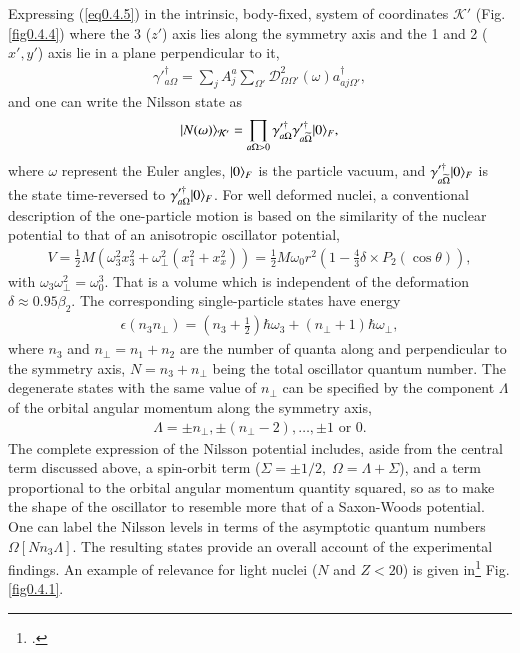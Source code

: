 Expressing (\ref{eq0.4.5}) in the intrinsic, body-fixed, system of coordinates $\mathcal K'$ (Fig. \ref{fig0.4.4}) where the 3 ($z'$) axis lies along the symmetry axis and the 1 and 2 ($x',y'$) axis lie in a plane perpendicular to it, 
\begin{align}\label{eq0.4.6}
\gamma'^{\dagger}_{a\Omega}=\sum_jA_j^a\sum_{\Omega'}\mathcal D_{\Omega\Omega'}^2(\omega)a^\dagger_{aj\Omega'},
\end{align}
and one can write the Nilsson state as 
\begin{align}\label{eq0.4.7}
|{N(\omega)} \rangle_{\mathcal K'}=\prod_{a\Omega>0}\gamma'^{\dagger}_{a\Omega}\gamma'^{\dagger}_{a\widetilde\Omega}|{0} \rangle_F,
\end{align}
where $\omega$ represent the Euler angles, $|{0} \rangle_F$ is the particle vacuum, and $\gamma'^{\dagger}_{a\widetilde\Omega}|{0} \rangle_F$ is the state time-reversed to $\gamma'^{\dagger}_{a\Omega}|{0} \rangle_F$. For well deformed nuclei, a conventional description of the one-particle motion is based on the similarity of the nuclear potential to that of an anisotropic oscillator potential, 
\begin{align}\label{eq0.4.8}
V=\frac{1}{2}M\left(\omega_3^2x_3^2+\omega^2_{\perp}(x_1^2+x_x^2)\right)=\frac{1}{2}M\omega_0r^2\left(1-\frac{4}{3}\delta\times P_2(\cos\theta)\right),
\end{align}
with $\omega_3\omega_{\perp}^2=\omega_0^3$. That is a volume which is independent of the deformation $\delta\approx0.95\beta_2$. The corresponding single-particle states have energy
\begin{align}\label{eq0.4.9}
\epsilon(n_3n_{\perp})=(n_3+\tfrac{1}{2})\hbar\omega_3+(n_{\perp}+1)\hbar\omega_{\perp},
\end{align}
where $n_3$ and $n_{\perp}=n_1+n_2$ are the number of quanta along and perpendicular to the symmetry axis, $N=n_3+n_{\perp}$ being the total oscillator quantum number. The degenerate states with the same value of $n_{\perp}$ can be specified by the component $\Lambda$ of the orbital angular momentum along the symmetry axis,
\begin{align}\label{eq0.4.10}
\Lambda=\pm n_{\perp}, \pm(n_{\perp}-2),\dots,\pm 1\text{ or } 0.
\end{align}
The complete expression of the Nilsson potential includes, aside from the central term discussed above, a spin-orbit term ($\Sigma=\pm1/2,\;\Omega=\Lambda+\Sigma$), and a term proportional to the orbital angular momentum quantity squared, so as to make the shape of the oscillator to resemble more that of a Saxon-Woods potential. One can  label the Nilsson levels in terms of the asymptotic quantum numbers $\Omega[Nn_3\Lambda]$. The resulting states provide an overall account of the experimental findings. An example of relevance for light nuclei ($N$ and $Z<20$) is given in\footnote{\cite{Mottelson:59}.} Fig. \ref{fig0.4.1}.

